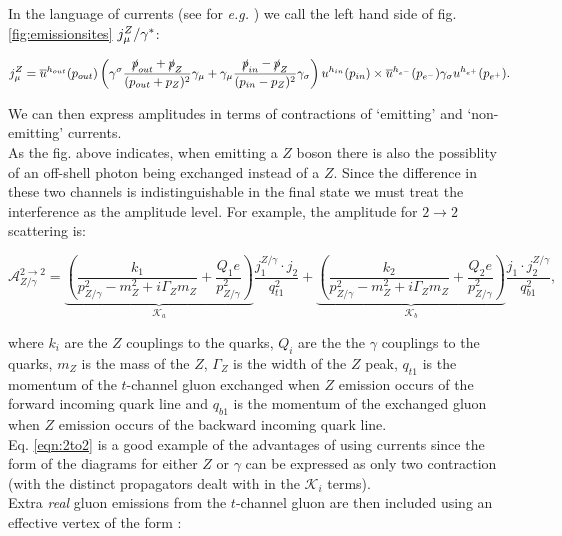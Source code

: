 	In the language of currents (see for \emph{e.g.} \cite{Constructing}) we call
	the left hand side of fig. \ref{fig:emissionsites} $j_\mu^Z/\gamma^*$:

	\begin{equation}
		j_\mu^Z = \overline{u}^{h_{out}}(p_{out})\left(\gamma^\sigma\frac{\slashed p_{out} +
			\slashed p_Z}{(p_{out} + p_Z)^2}\gamma_\mu + \gamma_\mu\frac{\slashed p_{in} -
			\slashed p_Z}{(p_{in} - p_Z)^2}\gamma_\sigma\right)u^{h_{in}}(p_{in})\times
			\overline{u}^{h_{e^-}}(p_{e^-})\gamma_\sigma u^{h_{e^+}}(p_{e^+}).
	\end{equation}

	We can then express amplitudes in terms of contractions of `emitting' and `non-emitting'
	currents.\\As the fig. above indicates, when emitting a $Z$ boson there is also the
	possiblity of an off-shell photon being exchanged instead of a $Z$.  Since the difference
	in these two channels is indistinguishable in the final state we must treat the
	interference as the amplitude level.  For example, the amplitude for $2\rightarrow 2$ scattering is:

	\begin{equation}
	\mathcal{A}_{Z/\gamma}^{2\rightarrow 2} =\underbrace{\left(\frac{k_1}{p_{Z/\gamma}^2 - m^2_Z +
	i\Gamma_Zm_Z} + \frac{Q_1e}{p_{Z/\gamma}^2}\right)}_{\mathcal{K}_a}\frac{j^{Z/\gamma}_1\cdot
	j_2}{q_{t1}^2} + \underbrace{\left(\frac{k_2}{p_{Z/\gamma}^2 - m^2_Z + i\Gamma_Zm_Z} +
	\frac{Q_2e}{p_{Z/\gamma}^2}\right)}_{\mathcal{K}_b}\frac{j_1\cdot j^{Z/\gamma}_2}{q_{b1}^2},
	\label{eqn:2to2}
	\end{equation}

	where $k_i$ are the $Z$ couplings to the quarks, $Q_i$ are the the $\gamma$ couplings to
	the quarks, $m_Z$ is the mass of the $Z$, $\Gamma_Z$ is the width of the $Z$ peak, $q_{t1}$
	is the momentum of the $t$-channel gluon exchanged when $Z$ emission occurs of the forward
	incoming quark line and $q_{b1}$ is the momentum of the exchanged gluon when $Z$
	emission occurs of the backward incoming quark line.\\Eq. \eqref{eqn:2to2} is a
	good example of the advantages of using currents since the form of the diagrams for either
	$Z$ or $\gamma$ can be expressed as only two contraction (with the distinct propagators
	dealt with in the $\mathcal{K}_i$ terms).\\Extra \emph{real} gluon emissions from the
	$t$-channel gluon are then included using an effective vertex of the form \cite{JeppeHiggs}\cite{Constructing}:

